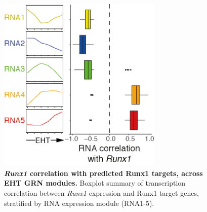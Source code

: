 
\begin{figure}[p]
    \centering
    \includegraphics[width=0.7\textwidth,height=0.7\textheight,keepaspectratio]{figures/chapter3/ch3_runx1-cor.png}
    \caption[{\textit{Runx1} correlation with predicted Runx1 targets, across EHT GRN modules.}]
    {\textbf{\textit{Runx1} correlation with predicted Runx1 targets, across EHT GRN modules.} 
    Boxplot summary of transcription correlation between \textit{Runx1} expression and Runx1 target genes, stratified by RNA expression module (RNA1-5). 
    }
    \label{fig:app_runx1-cor}
\end{figure}
\clearpage

